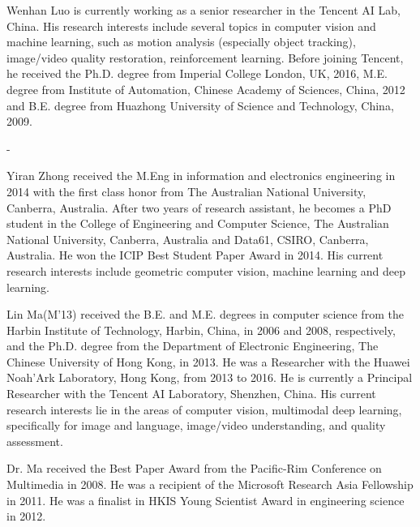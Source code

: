 \documentclass[journal]{IEEEtran}
\begin{document}
\begin{IEEEbiography}{Wenhan Luo}
is currently working as a senior researcher in the Tencent AI Lab, China. His research interests include several topics in computer vision and machine learning, such as motion analysis (especially object tracking), image/video quality restoration, reinforcement learning. Before joining Tencent, he received the Ph.D. degree from Imperial College London, UK, 2016, M.E. degree from Institute of Automation, Chinese Academy of Sciences, China, 2012 and B.E. degree from Huazhong University of Science and Technology, China, 2009.
\end{IEEEbiography}
-
\begin{IEEEbiography}{Yiran Zhong} received the M.Eng in information and electronics engineering in 2014 with the first class honor from The Australian National University, Canberra, Australia. After two years of research assistant, he becomes a PhD student in the College of Engineering and Computer Science, The Australian National University, Canberra, Australia and Data61, CSIRO, Canberra, Australia. He won the ICIP Best Student Paper Award in 2014. His current research interests include geometric computer vision, machine learning and deep learning.

\end{IEEEbiography}


\begin{IEEEbiography}{Lin Ma}(M’13)
received the B.E. and M.E. degrees in computer science from the Harbin Institute of Technology, Harbin, China, in 2006 and 2008, respectively, and the Ph.D. degree from the Department of Electronic Engineering, The Chinese University of Hong Kong, in 2013. He was a Researcher with the Huawei Noah’Ark Laboratory, Hong Kong, from 2013 to 2016. He is currently a Principal Researcher with the Tencent AI Laboratory, Shenzhen, China. His current research interests lie in the areas of computer vision, multimodal deep learning, specifically for image and language, image/video understanding, and quality assessment.

Dr. Ma received the Best Paper Award from the Pacific-Rim Conference on Multimedia in 2008. He was a recipient of the Microsoft Research Asia Fellowship in 2011. He was a finalist in HKIS Young Scientist Award in engineering science in 2012.


\end{IEEEbiography}
\end{document}
